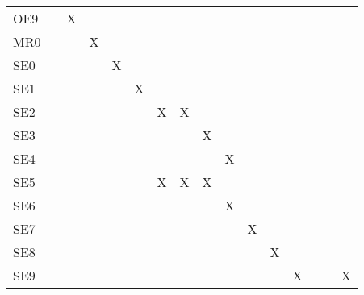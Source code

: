 \documentclass[12pt, titlepage]{article}
\begin{document}
\begin{longtable}{lcccclllllclcccc}
\multicolumn{1}{l|}{OE9} &  & X &  &  & \multicolumn{1}{c}{} & \multicolumn{1}{c}{} & \multicolumn{1}{c}{} & \multicolumn{1}{c}{} & \multicolumn{1}{c}{} &  & \multicolumn{1}{c}{} &  &  &  &  \\
\multicolumn{1}{l|}{MR0} &  &  & X &  & \multicolumn{1}{c}{} & \multicolumn{1}{c}{} & \multicolumn{1}{c}{} & \multicolumn{1}{c}{} & \multicolumn{1}{c}{} &  & \multicolumn{1}{c}{} &  &  &  &  \\
\multicolumn{1}{l|}{SE0} &  &  &  & X & \multicolumn{1}{c}{} & \multicolumn{1}{c}{} & \multicolumn{1}{c}{} & \multicolumn{1}{c}{} & \multicolumn{1}{c}{} &  & \multicolumn{1}{c}{} &  &  &  &  \\
\multicolumn{1}{l|}{SE1} &  &  &  &  & \multicolumn{1}{c}{X} & \multicolumn{1}{c}{} & \multicolumn{1}{c}{} & \multicolumn{1}{c}{} & \multicolumn{1}{c}{} &  & \multicolumn{1}{c}{} &  &  &  &  \\
\multicolumn{1}{l|}{SE2} &  &  &  &  & \multicolumn{1}{c}{} & \multicolumn{1}{c}{X} & \multicolumn{1}{c}{X} & \multicolumn{1}{c}{} & \multicolumn{1}{c}{} &  & \multicolumn{1}{c}{} &  &  &  &  \\
\multicolumn{1}{l|}{SE3} &  &  &  &  & \multicolumn{1}{c}{} & \multicolumn{1}{c}{} & \multicolumn{1}{c}{} & \multicolumn{1}{c}{X} & \multicolumn{1}{c}{} &  & \multicolumn{1}{c}{} &  &  &  &  \\
\multicolumn{1}{l|}{SE4} &  &  &  &  & \multicolumn{1}{c}{} & \multicolumn{1}{c}{} & \multicolumn{1}{c}{} & \multicolumn{1}{c}{} & \multicolumn{1}{c}{X} &  & \multicolumn{1}{c}{} &  &  &  &  \\
\multicolumn{1}{l|}{SE5} &  &  &  &  & \multicolumn{1}{c}{} & \multicolumn{1}{c}{X} & \multicolumn{1}{c}{X} & \multicolumn{1}{c}{X} & \multicolumn{1}{c}{} &  & \multicolumn{1}{c}{} &  &  &  &  \\
\multicolumn{1}{l|}{SE6} & \multicolumn{1}{l}{} & \multicolumn{1}{l}{} & \multicolumn{1}{l}{} & \multicolumn{1}{l}{} &  &  &  &  & \multicolumn{1}{c}{X} &  & \multicolumn{1}{c}{} &  &  &  &  \\
\multicolumn{1}{l|}{SE7} & \multicolumn{1}{l}{} & \multicolumn{1}{l}{} & \multicolumn{1}{l}{} & \multicolumn{1}{l}{} &  &  &  &  &  & X & \multicolumn{1}{c}{} &  &  &  &  \\
\multicolumn{1}{l|}{SE8} & \multicolumn{1}{l}{} & \multicolumn{1}{l}{} & \multicolumn{1}{l}{} & \multicolumn{1}{l}{} &  &  &  &  &  &  & \multicolumn{1}{c}{X} &  &  &  &  \\
\multicolumn{1}{l|}{SE9} & \multicolumn{1}{l}{} & \multicolumn{1}{l}{} & \multicolumn{1}{l}{} & \multicolumn{1}{l}{} &  &  &  &  &  &  & \multicolumn{1}{c}{} & X &  &  & X \\

\end{longtable}
\end{document}
